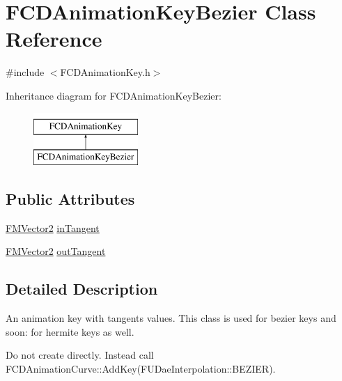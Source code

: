 \hypertarget{classFCDAnimationKeyBezier}{
\section{FCDAnimationKeyBezier Class Reference}
\label{classFCDAnimationKeyBezier}
}


{\ttfamily \#include $<$FCDAnimationKey.h$>$}

Inheritance diagram for FCDAnimationKeyBezier:\begin{figure}[H]
\begin{center}
\leavevmode
\includegraphics[height=2.000000cm]{classFCDAnimationKeyBezier}
\end{center}
\end{figure}
\subsection*{Public Attributes}
\begin{DoxyCompactItemize}
\item 
\hyperlink{classFMVector2}{FMVector2} \hyperlink{classFCDAnimationKeyBezier_a9376d6dde01d5a78629935b1bebf1ac1}{inTangent}
\item 
\hyperlink{classFMVector2}{FMVector2} \hyperlink{classFCDAnimationKeyBezier_a46baf873490cd046c4b54ea4f8926bf7}{outTangent}
\end{DoxyCompactItemize}


\subsection{Detailed Description}
An animation key with tangents values. This class is used for bezier keys and soon: for hermite keys as well.

Do not create directly. Instead call FCDAnimationCurve::AddKey(FUDaeInterpolation::BEZIER). 

